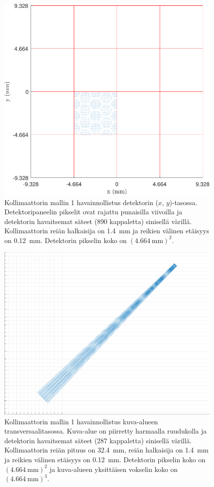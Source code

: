\begin{figure}[H]
    \centering
    \captionsetup{width=.9\linewidth}
    \includegraphics[width=.9\linewidth]{kuvat/malli1_2D.pdf}
    \caption{Kollimaattorin mallin 1 havainnollistus detektorin ($x$, $y$)-tasossa. Detektoripaneelin pikselit ovat rajattu punaisilla viivoilla ja detektorin havaitsemat säteet (890 kappaletta) sinisellä värillä. Kollimaattorin reiän halkaisija on \qty{1.4}{\milli\meter} ja reikien välinen etäisyys on \qty{0.12}{\milli\meter}. Detektorin pikselin koko on $(\qty{4.664}{\milli\meter})^2$.}
    \label{fig:ray1_2D}
\end{figure}
\begin{figure}[H]
    \centering
    \captionsetup{width=.9\linewidth}
    \includegraphics[width=.9\linewidth]{kuvat/malli1_3D.pdf}
    \caption{Kollimaattorin mallin 1 havainnollistus kuva-alueen transversaalitasossa. Kuva-alue on piirretty harmaalla ruudukolla ja detektorin havaitsemat säteet (287 kappaletta) sinisellä värillä. Kollimaattorin reiän pituus on \qty{32.4}{\milli\meter}, reiän halkaisija on \qty{1.4}{\milli\meter} ja reikien välinen etäisyys on \qty{0.12}{\milli\meter}. Detektorin pikselin koko on $(\qty{4.664}{\milli\meter})^2$ ja kuva-alueen yksittäisen vokselin koko on $(\qty{4.664}{\milli\meter})^{3}$.}
    \label{fig:ray1_3D}
\end{figure}
